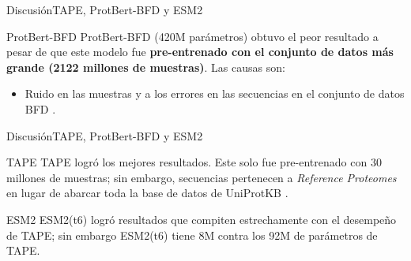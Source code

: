 \documentclass[10pt]{beamer}
\newcommand{\1}{
	\setbeamertemplate{background}{
		\texttt{[image: img/1]}
		\tikz[overlay] \fill[fill opacity=0.75,fill=white] (0,0) rectangle (-\paperwidth,\paperheight);
	}
}
\begin{document}
	


\begin{frame}{Discusión}{TAPE, ProtBert-BFD y ESM2}
	
	\begin{block}{ProtBert-BFD}
		ProtBert-BFD (420M parámetros) obtuvo el peor resultado a pesar de que este modelo fue \textbf{pre-entrenado con el conjunto de datos más grande (2122 millones de muestras)}. Las causas son: 
	\end{block}

	\begin{block}{}
		\begin{itemize}
			\item  Ruido en las muestras y a los errores en las secuencias en el conjunto de datos BFD \cite{elnaggar2021prottrans}.
		\end{itemize}
	\end{block}
	
\end{frame}



\begin{frame}{Discusión}{TAPE, ProtBert-BFD y ESM2}
	
	\begin{block}{TAPE}
		TAPE logró los mejores resultados. Este solo fue pre-entrenado con 30 millones de muestras; sin embargo, secuencias pertenecen a \textit{Reference Proteomes} en lugar de abarcar toda la base de datos de UniProtKB \cite{finn2016pfam}. 
	\end{block}
	
	\begin{block}{ESM2}
		ESM2(t6) logró resultados que compiten estrechamente con el desempeño de TAPE; sin embargo ESM2(t6) tiene 8M contra los 92M de parámetros de TAPE.		
	\end{block}
\end{frame}
\end{document}
